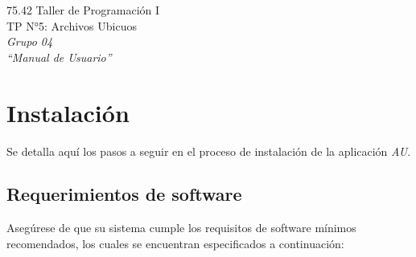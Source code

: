 \documentclass{article}
\begin{document}
\setcounter{page}{5}



\begin{titlepage}
	\vspace*{\fill}
	\begin{center}
		\Large 75.42 Taller de Programación I \\
		\Huge TP N°5: Archivos Ubicuos \\
		\bigskip\huge\textit{Grupo 04} \\
		\bigskip\bigskip\bigskip\bigskip\bigskip\bigskip
		\bigskip\bigskip\bigskip\bigskip\bigskip\bigskip\bigskip
		\medskip\huge\textit{``Manual de Usuario''} \\
		\date{}
	\end{center}
	\vspace*{\fill}
\end{titlepage}
\newpage




\tableofcontents
\newpage
{}




\section{Instalación}
	
	Se detalla aquí los pasos a seguir en el proceso de instalación de la aplicación \textit{AU}.
\bigskip



\subsection{Requerimientos de software}
	
	Asegúrese de que su sistema cumple los requisitos de software mínimos recomendados, los cuales se encuentran especificados a continuación:
	\medskip
\end{document}
